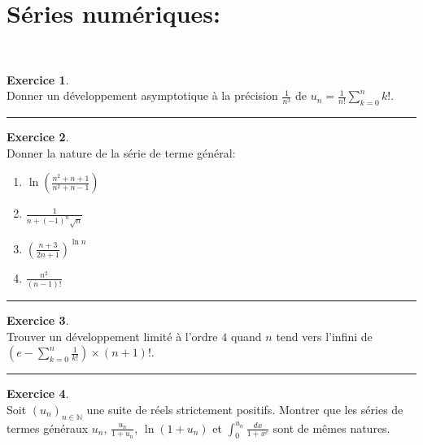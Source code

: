\documentclass[a4paper,10pt]{article}
\theoremstyle{definition}
\theoremstyle{definition}
\newtheorem{exo}{Exercice}
\newcommand{\N}{\mathbb{N}}
\begin{document}
\section*{Séries numériques:}\hfill\\%
\begin{minipage}{1\linewidth}
	\begin{minipage}[t]{0.48\linewidth}
		\raggedright
		
		
		
		\begin{exo}\quad\\[0.25cm]
			Donner un développement asymptotique à la précision $\frac{1}{n^3}$ de $u_n=\frac{1}{n!}\sum_{k=0}^{n}k!$.
			
			\centering
			\rule{1\linewidth}{0.6pt}
		\end{exo}
		
		\begin{exo}\quad\\[0.25cm]
			Donner la nature de la série de terme général:
			\begin{multicols}{2}
				\begin{enumerate}
					\item $\ln\left(\frac{n^2+n+1}{n^2+n-1}\right)$
					\item $\frac{1}{n+(-1)^n\sqrt{n}}$
					\item $\left(\frac{n+3}{2n+1}\right)^{\ln n}$
					\item $\frac{n^2}{(n-1)!}$
				\end{enumerate}
			\end{multicols}
			 
			
			\centering
			\rule{1\linewidth}{0.6pt}
		\end{exo}	
		
			\begin{exo}\quad\\[0.25cm]
			
			Trouver un développement limité à l'ordre $4$ quand $n$ tend vers l'infini de $\left(e-\sum_{k=0}^{n}\frac{1}{k!}\right)\times(n+1)!$.
			
			\centering
			\rule{1\linewidth}{0.6pt}
		\end{exo}	
		
					\begin{exo}\quad\\[0.25cm]
						Soit $(u_n)_{n\in\N}$ une suite de réels strictement positifs. Montrer que les séries de termes généraux $u_n$, $\frac{u_n}{1+u_n}$, $\ln(1+u_n)$ et $\int_{0}^{u_n}\frac{dx}{1+x^e}$  sont de mêmes natures.
			

\end{exo}
\end{minipage}
\end{minipage}
\end{document}
